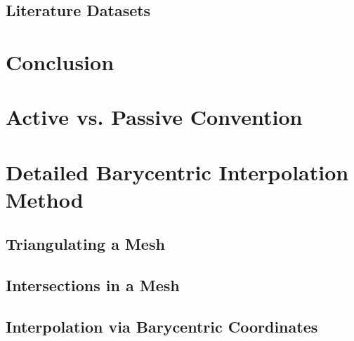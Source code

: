\subsection{Literature Datasets}
\section{Conclusion} 
\section{Active vs. Passive Convention}
\section{Detailed Barycentric Interpolation Method}
\subsection{Triangulating a  Mesh}
\subsection{Intersections in a  Mesh}
\subsection{Interpolation via Barycentric Coordinates}
